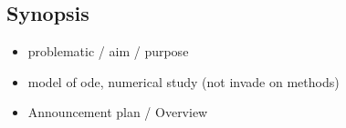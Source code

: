 \documentclass{article}
\begin{document}



\newpage

\subsection*{Synopsis}

\begin{itemize}
    \item problematic / aim / purpose
    \item model of ode, numerical study (not invade on methods)
    \item Announcement plan / Overview
\end{itemize}

\end{document}
